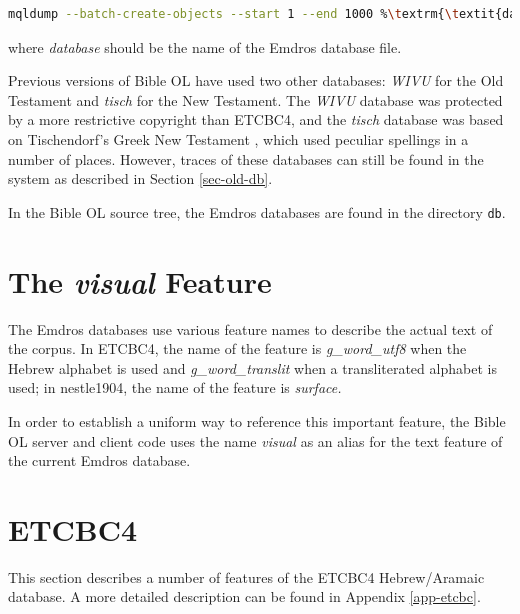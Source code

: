 \documentclass[11pt,oneside,a4paper]{memoir}
\begin{document}
\begin{lstlisting}[language=bash]
mqldump --batch-create-objects --start 1 --end 1000 %\textrm{\textit{database}}\label{list-mqldump}\index{mqldump}%
\end{lstlisting}

\noindent
where \emph{database} should be the name of the Emdros database file.

Previous versions of Bible OL have used two other databases: \emph{WIVU} for the Old Testament and
\emph{tisch} for the New Testament. The \emph{WIVU} database was protected by a more restrictive
copyright than ETCBC4, and the \emph{tisch} database was based on Tischendorf's Greek New Testament%
,
which used peculiar spellings in a number of places. However, traces of these databases can still be
found in the system as described in Section \ref{sec-old-db}.

In the Bible OL source tree, the Emdros databases are found in the directory \texttt{db}.


\section{The \emph{visual} Feature}\label{sec-visual}

The Emdros databases use various feature names to describe the actual text of the corpus. In ETCBC4,
the name of the feature is \emph{g\_word\_utf8} when the Hebrew alphabet is used and
\emph{g\_word\_translit} when a transliterated alphabet is used; in nestle1904, the name of the feature
is \emph{surface.}

In order to establish a uniform way to reference this important feature, the Bible OL server and
client code uses the name \emph{visual} as an alias for the text feature of the current Emdros
database.



\section{ETCBC4}

This section describes a number of features of the ETCBC4 Hebrew/Aramaic database. A more detailed
description can be found in Appendix \ref{app-etcbc}.
\end{document}
